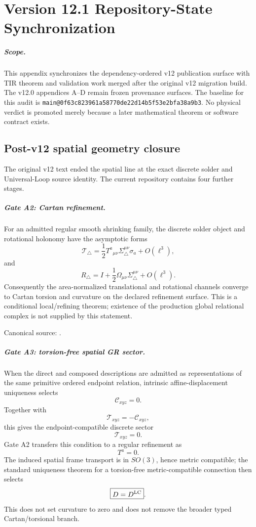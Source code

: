 \chapter{Version 12.1 Repository-State Synchronization}
\label{app:v12_1_repository_sync}

\paragraph{Scope.}
This appendix synchronizes the dependency-ordered v12 publication surface with
TIR theorem and validation work merged after the original v12 migration build.
The v12.0 appendices A--D remain frozen provenance surfaces.  The baseline for
this audit is \texttt{main@0f63c823961a58770de22d14b5f53e2bfa38a9b3}.
No physical verdict is promoted merely because a later mathematical theorem or
software contract exists.

\section{Post-v12 spatial geometry closure}

The original v12 text ended the spatial line at the exact discrete solder and
Universal-Loop source identity.  The current repository contains four further
stages.

\paragraph{Gate A2: Cartan refinement.}
For an admitted regular smooth shrinking family, the discrete solder object and
rotational holonomy have the asymptotic forms
\[
\mathcal T_{\triangle}
=\frac12 T^a{}_{\mu\nu}\Sigma^{\mu\nu}_{\triangle}\sigma_a
+O(\ell^3),
\]
and
\[
R_{\triangle}
=I+\frac12\Omega_{\mu\nu}\Sigma^{\mu\nu}_{\triangle}
+O(\ell^3).
\]
Consequently the area-normalized translational and rotational channels converge
to Cartan torsion and curvature on the declared refinement surface.  This is a
conditional local/refining theorem; existence of the production global
relational complex is not supplied by this statement.

Canonical source:
.

\paragraph{Gate A3: torsion-free spatial GR sector.}
When the direct and composed descriptions are admitted as representations of
the same primitive ordered endpoint relation, intrinsic affine-displacement
uniqueness selects
\[
\mathcal C_{xyz}=0.
\]
Together with
\[
\mathcal T_{xyz}=-\mathcal C_{xyz},
\]
this gives the endpoint-compatible discrete sector
\[
\mathcal T_{xyz}=0.
\]
Gate A2 transfers this condition to a regular refinement as
\[
\boxed{T^a=0}.
\]
The induced spatial frame transport is in \(SO(3)\), hence metric compatible;
the standard uniqueness theorem for a torsion-free metric-compatible
connection then selects
\[
\boxed{D=D^{\rm LC}}.
\]
This does not set curvature to zero and does not remove the broader typed
Cartan/torsional branch.

